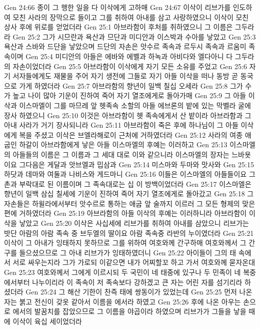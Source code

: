 Gen 24:66  종이 그 행한 일을 다 이삭에게 고하매
Gen 24:67  이삭이 리브가를 인도하여 모친 사라의 장막으로 들이고 그를 취하여 아내를 삼고 사랑하였으니 이삭이 모친 상사 후에 위로를 얻었더라
Gen 25:1  아브라함이 후처를 취하였으니 그 이름은 그두라라
Gen 25:2  그가 시므란과 욕산과 므단과 미디안과 이스박과 수아를 낳았고
Gen 25:3  욕산과 스바와 드단을 낳았으며 드단의 자손은 앗수르 족속과 르두시 족속과 르움미 족속이며
Gen 25:4  미디안의 아들은 에바와 에벨과 하녹과 아비다와 엘다아니 다 그두라의 자손이었더라
Gen 25:5  아브라함이 이삭에게 자기 모든 소유를 주었고
Gen 25:6  자기 서자들에게도 재물을 주어 자기 생전에 그들로 자기 아들 이삭을 떠나 동방 곧 동국으로 가게 하였더라
Gen 25:7  아브라함의 향년이 일백 칠십 오세라
Gen 25:8  그가 수가 높고 나이 많아 기운이 진하여 죽어 자기 열조에게로 돌아가매
Gen 25:9  그 아들 이삭과 이스마엘이 그를 마므레 앞 헷족속 소할의 아들 에브론의 밭에 있는 막벨라 굴에 장사 하였으니
Gen 25:10  이것은 아브라함이 헷 족속에게서 산 밭이라 아브라함과 그 아내 사라가 거기 장사되니라
Gen 25:11  아브라함이 죽은 후에 하나님이 그 아들 이삭에게 복을 주셨고 이삭은 브엘라해로이 근처에 거하였더라
Gen 25:12  사라의 여종 애굽인 하갈이 아브라함에게 낳은 아들 이스마엘의 후예는 이러하고
Gen 25:13  이스마엘의 아들들의 이름은 그 이름과 그 세대 대로 이와 같으니라 이스마엘의 장자는 느바욧이요 그다음은 게달과 앗브엘과 밉삼과
Gen 25:14  미스마와 두마와 맛사와
Gen 25:15  하닷과 데마와 여둘과 나비스와 게드마니
Gen 25:16  이들은 이스마엘의 아들들이요 그 촌과 부락대로 된 이름이며 그 족속대로는 십 이 방백이었더라
Gen 25:17  이스마엘은 향년이 일백 삼십 칠세에 기운이 진하여 죽어 자기 열조에게로 돌아갔고
Gen 25:18  그 자손들은 하윌라에서부터 앗수르로 통하는 애굽 앞 술까지 이르러 그 모든 형제의 맞은편에 거하였더라
Gen 25:19  아브라함의 아들 이삭의 후예는 이러하니라 아브라함이 이삭을 낳았고
Gen 25:20  이삭은 사십세에 리브가를 취하여 아내를 삼았으니 리브가는 밧단 아람의 아람 족속 중 브두엘의 딸이요 아람 족속중 라반의 누이였더라
Gen 25:21  이삭이 그 아내가 잉태하지 못하므로 그를 위하여 여호와께 간구하매 여호와께서 그 간구를 들으셨으므로 그 아내 리브가가 잉태하였더니
Gen 25:22  아이들이 그의 태 속에서 서로 싸우는지라 그가 가로되 이같으면 내가 어찌할꼬 하고 가서 여호와께 묻자온대
Gen 25:23  여호와께서 그에게 이르시되 두 국민이 네 태중에 있구나 두 민족이 네 복중에서부터 나누이리라 이 족속이 저 족속보다 강하겠고 큰 자는 어린 자를 섬기리라 하셨더라
Gen 25:24  그 해산 기한이 찬즉 태에 쌍동이가 있었는데
Gen 25:25  먼저 나온 자는 붉고 전신이 갖옷 같아서 이름을 에서라 하였고
Gen 25:26  후에 나온 아우는 손으로 에서의 발꿈치를 잡았으므로 그 이름을 야곱이라 하였으며 리브가가 그들을 낳을 때에 이삭이 육십 세이었더라
